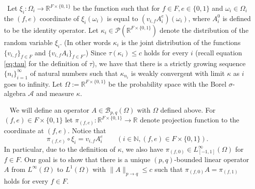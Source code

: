 \documentclass[a4wider]{amsart}
\theoremstyle{definitionbreak}\newtheorem{D}[theorem]{Definition}
\theoremstyle{definitionbreak}\newtheorem*{D*}{Definition}
\begin{document}
~Let $\xi_i:\Omega_i\to\mathbb{R}^{F\times\{0,1\}}$ be the function such that for $f\in F,e\in\{0,1\}$ and $\omega_i\in\Omega_i$ the $(f,e)$ coordinate of $\xi_i(\omega_i)$ is equal to $(v_{i,f}A_i^e)(\omega_i)$, where $A_i^0$ is defined to be the identity operator. Let $\kappa_i\in\mathcal{P}(\mathbb{R}^{F\times\{0,1\}})$ denote the distribution of the random variable $\xi_i$. (In other words $\kappa_i$ is the joint distribution of the functions $\{v_{i,f}\}_{f\in F}$ and $\{v_{i,f}A_i\}_{f\in F}$.) Since $\tau(\kappa_i)\leq c$ holds for every $i$ (recall equation \eqref{eq:tau} for the definition of $\tau$), we have that there is a strictly growing sequence $\{n_i\}_{i=1}^\infty$ of natural numbers such that $\kappa_{n_i}$ is weakly convergent with limit $\kappa$ as $i$ goes to infinity. Let $\Omega:=\mathbb{R}^{F\times\{0,1\}}$ be the probability space with the Borel $\sigma$-algebra $\mathcal{A}$ and measure $\kappa$.

~ We will define an operator $A\in \mathcal B_{p,q}(\Omega)$ with $\Omega$ defined above.  For $(f,e)\in F\times\{0,1\}$ let $\pi_{(f,e)}:\mathbb{R}^{F\times\{0,1\}}\to\mathbb{R}$ denote projection function to the coordinate at $(f,e)$. Notice that 
\begin{equation}\label{eq:pi} \pi_{(f,e)} \circ \xi_i=v_{i,f}A_i^e\qquad (i\in \mathbb N, (f, e)\in F\times \{0,1\}). \end{equation} In particular, due to the definition of $\kappa$, we also have $\pi_{(f,0)}\in L^{\infty}_{[-1,1]}(\Omega)$  for $f\in F$.  
Our goal is to show that there is a unique $(p,q)$-bounded  linear operator $A$ from $L^{\infty}(\Omega)$ to $L^{1}(\Omega)$ with $\|A\|_{p\rightarrow q}\leq c$ such that $\pi_{(f,0)}A=\pi_{(f,1)}$ holds for every $f\in F$.
\end{document}
